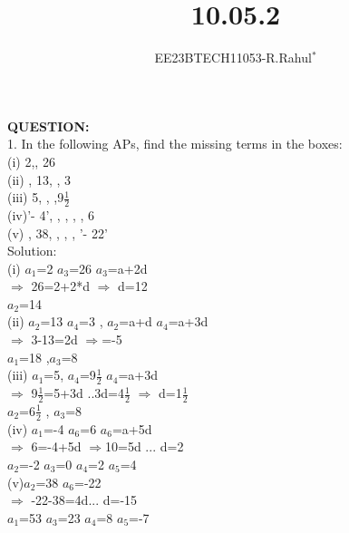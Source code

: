 \documentclass[journal,12pt,twocolumn]{IEEEtran}
\theoremstyle{remark}
\begin{document}

\vspace{3cm}
\title{\textbf{10.05.2}}
\author{EE23BTECH11053-R.Rahul$^{*}$%
}
\maketitle



\textbf{QUESTION:}\\
1. In the following APs, find the missing terms in the boxes:\\
(i) 2,, 26 \\
(ii) , 13, , 3\\
(iii) 5, , ,9\(\frac{1}{2}\)\\
(iv)'- 4', , , , , 6\\
(v) , 38, , , , '- 22'\\

Solution:\\
(i) $a_1$=2 $a_3$=26 $a_3$=a+2d\\
$\Longrightarrow$ 26=2+2*d $\Longrightarrow$ d=12\\
$a_2$=14\\
(ii) $a_2$=13 $a_4$=3 , $a_2$=a+d $a_4$=a+3d \\
$\Longrightarrow$ 3-13=2d $\Longrightarrow$=-5\\ $a_1$=18 ,$a_3$=8\\
(iii) $a_1$=5, $a_4$=9\(\frac{1}{2}\) $a_4$=a+3d\\
$\Longrightarrow$ 9\(\frac{1}{2}\)=5+3d ..3d=4\(\frac{1}{2}\) $\Longrightarrow$ d=1\(\frac{1}{2}\)\\
$a_2$=6\(\frac{1}{2}\) , $a_3$=8\\
(iv) $a_1$=-4 $a_6$=6 $a_6$=a+5d\\
$\Longrightarrow$ 6=-4+5d $\Longrightarrow$10=5d ... d=2\\
$a_2$=-2 $a_3$=0 $a_4$=2 $a_5$=4\\
(v)$a_2$=38 $a_6$=-22 \\
$\Longrightarrow$ -22-38=4d... d=-15\\
$a_1$=53 $a_3$=23 $a_4$=8 $a_5$=-7
\end{document}
